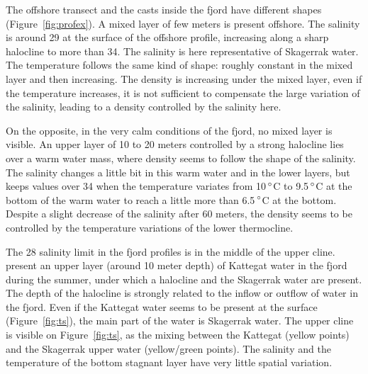 \documentclass[12pt,a4paper]{article}
\begin{document}
The offshore transect and the casts inside the fjord have different shapes
(Figure~\ref{fig:profex}).
A mixed layer of few meters is present offshore.
The salinity is around 29 at the surface of the offshore profile, increasing
along a sharp halocline to more than 34. The salinity is here representative
of Skagerrak water.
The temperature follows the same kind of shape: roughly constant
in the mixed layer and then increasing.
The density is increasing under the mixed layer, even if the temperature
increases, it is not sufficient to compensate the large variation
of the salinity, leading to a density controlled by the salinity here.

On the opposite, in the very calm
conditions of the fjord, no mixed layer is visible.
An upper layer of 10 to 20 meters controlled by a strong halocline
lies over a warm water mass, where density seems to follow the shape of
the salinity. The salinity changes a little bit in this warm water and in the lower layers,
but keeps values over 34 when the temperature variates from 10\,$^{\circ}$C
to 9.5\,$^{\circ}$C at the bottom of the warm water to reach a little
more than 6.5\,$^{\circ}$C at the bottom.
Despite a slight decrease of the salinity after 60 meters, the density
seems to be controlled by the temperature variations of the lower thermocline.

The 28 salinity limit in the fjord profiles is in the middle
of the upper cline. \cite{arneborg2003} present an upper layer (around 10 meter
depth) of Kattegat water in the fjord during the summer, under which a halocline
and the Skagerrak water are present. The depth of the halocline is strongly related
to the inflow or outflow of water in the fjord.
Even if the Kattegat water seems to be present at the surface (Figure~\ref{fig:ts}),
the main part of the water is Skagerrak water. The upper cline
is visible on Figure~\ref{fig:ts}, as the mixing between the Kattegat (yellow points)
and the Skagerrak upper water (yellow/green points).
The salinity and the temperature of the bottom stagnant layer
have very little spatial variation.
\end{document}
